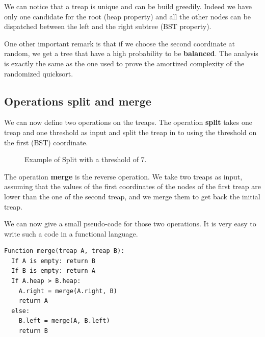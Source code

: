 \documentclass[a4paper, 11pt]{article}
\begin{document}
We can notice that a treap is unique and can be build greedily. Indeed we have only one candidate for the root (heap property) and all the other nodes can be dispatched between the left and the right subtree (BST property).

\medskip One other important remark is that if we choose the second coordinate at random, we get a tree that have a high probability to be \textbf{balanced}. The analysis is exactly the same as the one used to prove the amortized complexity of the randomized quicksort.

\newpage
\subsection{Operations split and merge}

We can now define two operations on the treaps. The operation \textbf{split} takes one treap and one threshold as input and split the treap in to using the threshold on the first (BST) coordinate.
\begin{figure}[h!]
  \centering
  \quad\quad
  \caption{Example of Split with a threshold of 7.}
\end{figure}

The operation \textbf{merge} is the reverse operation. We take two treaps as input, assuming that the values of the first coordinates of the nodes of the first treap are lower than the one of the second treap, and we merge them to get back the initial treap.

\medskip We can now give a small pseudo-code for those two operations. It is very easy to write such a code in a functional language.

\begin{verbatim}
Function merge(treap A, treap B):
  If A is empty: return B
  If B is empty: return A
  If A.heap > B.heap:
    A.right = merge(A.right, B)
    return A
  else:
    B.left = merge(A, B.left)
    return B
\end{verbatim}
\end{document}
